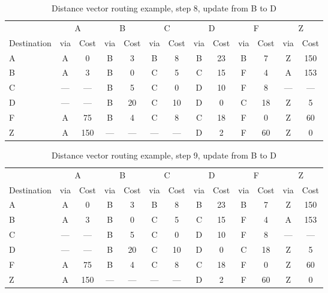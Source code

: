 \begin{table}
    \caption{Distance vector  routing example, step 8, update from B to D }
    \label{tab:dv:step:8}
\begin{tabular}{l|c|c|c|c|c|c|c|c|c|c|c|c}
    \toprule
      & \multicolumn{2}{c|}{A}&\multicolumn{2}{c|}{B}&\multicolumn{2}{c|}{C}&\multicolumn{2}{c|}{D}&\multicolumn{2}{c|}{F}&\multicolumn{2}{c|}{Z} \\
    Destination & via&Cost&via&Cost&via&Cost&via&Cost&via&Cost&via&Cost \\ 
    \midrule
    A & A & 0 &B & 3 &B & 8 &B & 23 &B & 7 &Z & 150 
 \\B & A & 3 &B & 0 &C & 5 &C & 15 &F & 4 &A & 153 
 \\C & --- & ---&B & 5 &C & 0 &D & 10 &F & 8 &--- & ---
 \\D & --- & ---&B & 20 &C & 10 &D & 0 &C & 18 &Z & 5 
 \\F & A & 75 &B & 4 &C & 8 &C & 18 &F & 0 &Z & 60 
 \\Z & A & 150 &--- & ---&--- & ---&D & 2 &F & 60 &Z & 0 
    \\ \bottomrule 
\end{tabular}
\end{table}
    

\begin{table}
    \caption{Distance vector  routing example, step 9, update from B to D }
    \label{tab:dv:step:9}
\begin{tabular}{l|c|c|c|c|c|c|c|c|c|c|c|c}
    \toprule
      & \multicolumn{2}{c|}{A}&\multicolumn{2}{c|}{B}&\multicolumn{2}{c|}{C}&\multicolumn{2}{c|}{D}&\multicolumn{2}{c|}{F}&\multicolumn{2}{c|}{Z} \\
    Destination & via&Cost&via&Cost&via&Cost&via&Cost&via&Cost&via&Cost \\ 
    \midrule
    A & A & 0 &B & 3 &B & 8 &B & 23 &B & 7 &Z & 150 
 \\B & A & 3 &B & 0 &C & 5 &C & 15 &F & 4 &A & 153 
 \\C & --- & ---&B & 5 &C & 0 &D & 10 &F & 8 &--- & ---
 \\D & --- & ---&B & 20 &C & 10 &D & 0 &C & 18 &Z & 5 
 \\F & A & 75 &B & 4 &C & 8 &C & 18 &F & 0 &Z & 60 
 \\Z & A & 150 &--- & ---&--- & ---&D & 2 &F & 60 &Z & 0 
    \\ \bottomrule 
\end{tabular}
\end{table}
    

